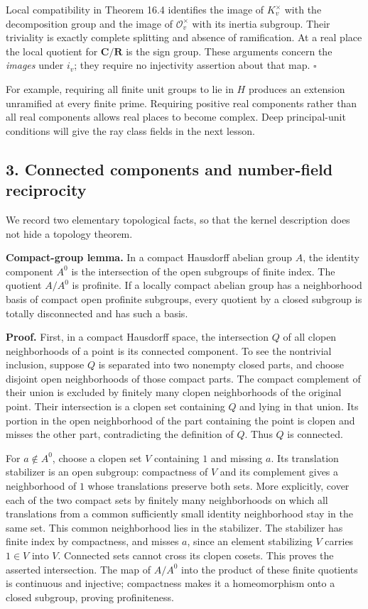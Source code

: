 \documentclass[11pt,a4paper]{article}
\begin{document}
Local compatibility in Theorem 16.4 identifies the image of
\(K_v^\times\) with the decomposition group and the image of
\(\mathcal O_v^\times\) with its inertia subgroup. Their triviality is
exactly complete splitting and absence of ramification. At a real place
the local quotient for \(\mathbf C/\mathbf R\) is the sign group. These
arguments concern the \emph{images} under \(i_v\); they require no
injectivity assertion about that map. \(\square\)

For example, requiring all finite unit groups to lie in \(H\) produces
an extension unramified at every finite prime. Requiring positive real
components rather than all real components allows real places to become
complex. Deep principal-unit conditions will give the ray class fields
in the next lesson.

\subsection{3. Connected components and number-field
reciprocity}\label{connected-components-and-number-field-reciprocity}

We record two elementary topological facts, so that the kernel
description does not hide a topology theorem.

\textbf{Compact-group lemma.} In a compact Hausdorff abelian group
\(A\), the identity component \(A^0\) is the intersection of the open
subgroups of finite index. The quotient \(A/A^0\) is profinite. If a
locally compact abelian group has a neighborhood basis of compact open
profinite subgroups, every quotient by a closed subgroup is totally
disconnected and has such a basis.

\textbf{Proof.} First, in a compact Hausdorff space, the intersection
\(Q\) of all clopen neighborhoods of a point is its connected component.
To see the nontrivial inclusion, suppose \(Q\) is separated into two
nonempty closed parts, and choose disjoint open neighborhoods of those
compact parts. The compact complement of their union is excluded by
finitely many clopen neighborhoods of the original point. Their
intersection is a clopen set containing \(Q\) and lying in that union.
Its portion in the open neighborhood of the part containing the point is
clopen and misses the other part, contradicting the definition of \(Q\).
Thus \(Q\) is connected.

For \(a\notin A^0\), choose a clopen set \(V\) containing \(1\) and
missing \(a\). Its translation stabilizer is an open subgroup:
compactness of \(V\) and its complement gives a neighborhood of \(1\)
whose translations preserve both sets. More explicitly, cover each of
the two compact sets by finitely many neighborhoods on which all
translations from a common sufficiently small identity neighborhood stay
in the same set. This common neighborhood lies in the stabilizer. The
stabilizer has finite index by compactness, and misses \(a\), since an
element stabilizing \(V\) carries \(1\in V\) into \(V\). Connected sets
cannot cross its clopen cosets. This proves the asserted intersection.
The map of \(A/A^0\) into the product of these finite quotients is
continuous and injective; compactness makes it a homeomorphism onto a
closed subgroup, proving profiniteness.
\end{document}
